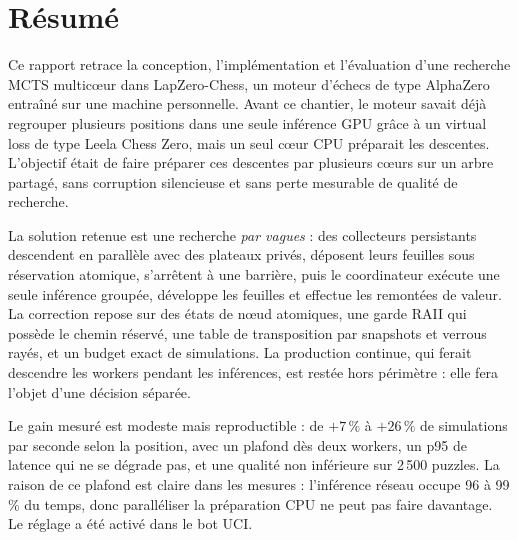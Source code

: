 \section*{R\'esum\'e}

Ce rapport retrace la conception, l'impl\'ementation et l'\'evaluation d'une
recherche MCTS multic\oe{}ur dans LapZero-Chess, un moteur d'\'echecs de type
AlphaZero entra\^in\'e sur une machine personnelle. Avant ce chantier, le
moteur savait d\'ej\`a regrouper plusieurs positions dans une seule inf\'erence
GPU gr\^ace \`a un virtual loss de type Leela Chess Zero, mais un seul c\oe{}ur
CPU pr\'eparait les descentes. L'objectif \'etait de faire pr\'eparer ces
descentes par plusieurs c\oe{}urs sur un arbre partag\'e, sans corruption
silencieuse et sans perte mesurable de qualit\'e de recherche.

La solution retenue est une recherche \emph{par vagues} : des collecteurs
persistants descendent en parall\`ele avec des plateaux priv\'es, d\'eposent
leurs feuilles sous r\'eservation atomique, s'arr\^etent \`a une barri\`ere, puis
le coordinateur ex\'ecute une seule inf\'erence group\'ee, d\'eveloppe les
feuilles et effectue les remont\'ees de valeur. La correction repose sur des
\'etats de n\oe{}ud atomiques, une garde RAII qui poss\`ede le chemin r\'eserv\'e,
une table de transposition par snapshots et verrous ray\'es, et un budget
exact de simulations. La production continue, qui ferait descendre les
workers pendant les inf\'erences, est rest\'ee hors p\'erim\`etre : elle fera
l'objet d'une d\'ecision s\'epar\'ee.

Le gain mesur\'e est modeste mais reproductible : de $+7\,\%$ \`a $+26\,\%$ de
simulations par seconde selon la position, avec un plafond d\`es deux workers,
un p95 de latence qui ne se d\'egrade pas, et une qualit\'e non inf\'erieure sur
2\,500 puzzles. La raison de ce plafond est claire dans les mesures :
l'inf\'erence r\'eseau occupe 96 \`a 99\,\% du temps, donc parall\'eliser la
pr\'eparation CPU ne peut pas faire davantage. Le r\'eglage
 a \'et\'e activ\'e dans le bot UCI.

\vspace{0.6cm}

